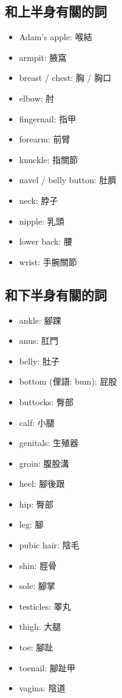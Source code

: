 \subsection{和上半身有關的詞}
\begin{multicols}{3}
\begin{itemize}
  \itemsep0em
  \item Adam's apple: 喉結
  \item armpit: 腋窩
  \item breast / chest: 胸 / 胸口
  \item elbow: 肘
  \item fingernail: 指甲
  \item forearm: 前臂
  \item knuckle: 指關節
  \item navel / belly button: 肚臍
  \item neck: 脖子
  \item nipple: 乳頭
  \item lower back: 腰
  \item wrist: 手腕關節
\end{itemize}
\end{multicols}

\subsection{和下半身有關的詞}
\begin{multicols}{3}
\begin{itemize}
  \itemsep0em
  \item ankle: 腳踝
  \item anus: 肛門
  \item belly: 肚子
  \item bottom (俚語: bum): 屁股
  \item buttocks: 臀部
  \item calf: 小腿
  \item genitals: 生殖器
  \item groin: 腹股溝
  \item heel: 腳後跟
  \item hip: 臀部
  \item leg: 腳
  \item pubic hair: 陰毛
  \item shin: 脛骨
  \item sole: 腳掌
  \item testicles: 睪丸
  \item thigh: 大腿
  \item toe: 腳趾
  \item toenail: 腳趾甲
  \item vagina: 陰道
\end{itemize}
\end{multicols}

